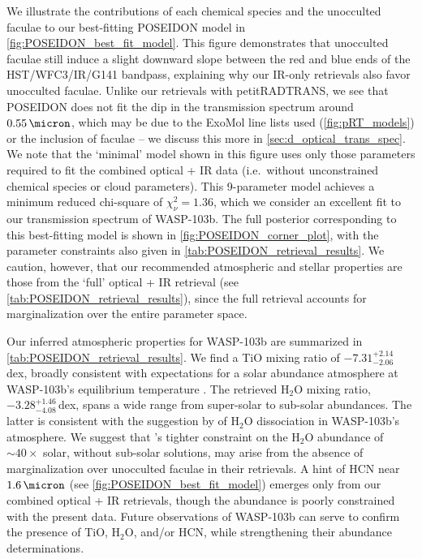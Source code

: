 \documentclass[twocolumn]{aastex63}
\begin{document}
We illustrate the contributions of each chemical species and the unocculted faculae to our best-fitting POSEIDON model in \autoref{fig:POSEIDON_best_fit_model}. This figure demonstrates that unocculted faculae still induce a slight downward slope between the red and blue ends of the HST/WFC3/IR/G141 bandpass, explaining why our IR-only retrievals also favor unocculted faculae. Unlike our retrievals with petitRADTRANS, we see that POSEIDON does not fit the dip in the transmission spectrum around $0.55\,\micron$, which may be due to the ExoMol line lists used (\autoref{fig:pRT_models}) or the inclusion of faculae -- we discuss this more in \autoref{sec:d_optical_trans_spec}. We note that the `minimal' model shown in this figure uses only those parameters required to fit the combined optical + IR data (i.e.\ without unconstrained chemical species or cloud parameters). This 9-parameter model achieves a minimum reduced chi-square of $\chi^2_{\nu} = 1.36$, which we consider an excellent fit to our transmission spectrum of WASP-103b. The full posterior corresponding to this best-fitting model is shown in \autoref{fig:POSEIDON_corner_plot}, with the parameter constraints also given in \autoref{tab:POSEIDON_retrieval_results}. We caution, however, that our recommended atmospheric and stellar properties are those from the `full' optical + IR retrieval (see \autoref{tab:POSEIDON_retrieval_results}), since the full retrieval accounts for marginalization over the entire parameter space. 

Our inferred atmospheric properties for WASP-103b are summarized in \autoref{tab:POSEIDON_retrieval_results}. We find a TiO mixing ratio of $-7.31^{+2.14}_{-2.06}$\,dex, broadly consistent with expectations for a solar abundance atmosphere at WASP-103b's equilibrium temperature \citep{Woitke2018}. The retrieved H$_2$O mixing ratio, $-3.28^{+1.46}_{-4.08}$\,dex, spans a wide range from super-solar to sub-solar abundances. The latter is consistent with the suggestion by \citet{Kreidberg2018} of H$_2$O dissociation in WASP-103b's atmosphere. We suggest that \citet{Wilson2020}'s tighter constraint on the H$_2$O abundance of ${\sim}40\times$ solar, without sub-solar solutions, may arise from the absence of marginalization over unocculted faculae in their retrievals. A hint of HCN near $1.6\,\micron$ (see \autoref{fig:POSEIDON_best_fit_model}) emerges only from our combined optical + IR retrievals, though the abundance is poorly constrained with the present data. Future observations of WASP-103b can serve to confirm the presence of TiO, H$_2$O, and/or HCN, while strengthening their abundance determinations.
\end{document}
